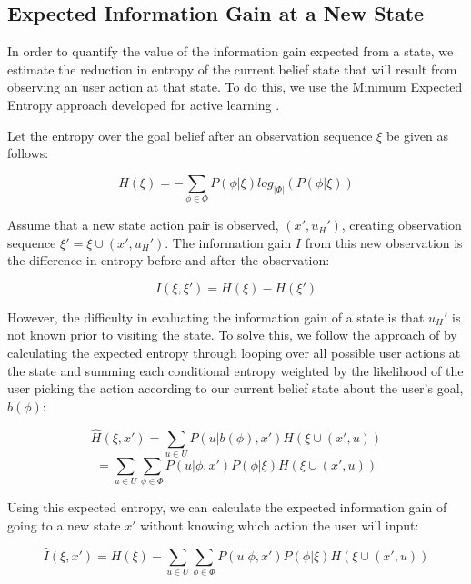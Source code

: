 \documentclass[conference]{IEEEtran}
\begin{document}
\subsection{Expected Information Gain at a New State}

In order to quantify the value of the information gain expected from a state, we estimate the reduction in entropy of the current belief state that will result from observing an user action at that state. To do this, we use the Minimum Expected Entropy approach developed for active learning \cite{holub2008entropy}.

Let the entropy over the goal belief after an observation sequence $\xi$ be given as follows:

\[
H(\xi) = -\sum_{\phi \in \Phi} P(\phi|\xi)log_{|\Phi|}(P(\phi|\xi))
\]

Assume that a new state action pair is observed, $(x',u_H')$, creating observation sequence $\xi' = \xi \cup (x', u_H')$. The information gain $I$ from this new observation is the difference in entropy before and after the observation:

\[
I(\xi, \xi') = H(\xi) - H(\xi')
\]

However, the difficulty in evaluating the information gain of a state is that $u_H'$ is not known prior to visiting the state. To solve this, we follow the approach of \citet{holub2008entropy} by calculating the expected entropy through looping over all possible user actions at the state and summing each conditional entropy weighted by the likelihood of the user picking the action according to our current belief state about the user's goal, $b(\phi)$:

\[
\hat{H}(\xi, x') = \sum_{u \in U} P(u|b(\phi),x')H(\xi \cup (x', u))
\]
\[
= \sum_{u \in U} \sum_{\phi \in \Phi} P(u|\phi,x')P(\phi|\xi)H(\xi \cup (x', u))
\]

Using this expected entropy, we can calculate the expected information gain of going to a new state $x'$ without knowing which action the user will input:

\[
\hat{I}(\xi, x') = H(\xi) - \sum_{u \in U} \sum_{\phi \in \Phi} P(u|\phi,x')P(\phi|\xi)H(\xi \cup (x', u))
\]
\end{document}
